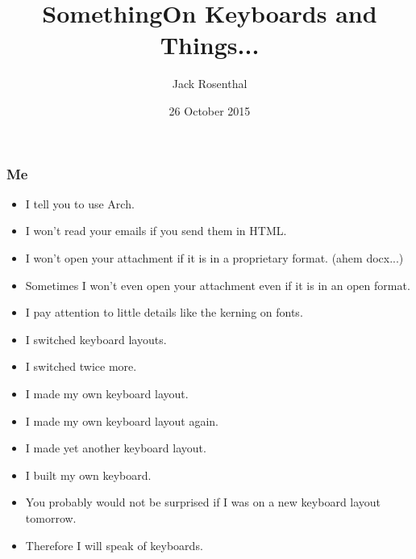 \documentclass{beamer}
\title{Something}
\author{Jack Rosenthal}
\date{26 October 2015}
\begin{document}
\begin{frame}
    \maketitle
\end{frame}

\begin{frame}
    \frametitle{Me}
    \pause
    \begin{itemize}
    \item I tell you to use Arch.\pause
    \item I won't read your emails if you send them in HTML.\pause
    \item I won't open your attachment if it is in a proprietary format. (ahem
        docx...)\pause
    \item Sometimes I won't even open your attachment even if it is in an open
        format.\pause
    \item I pay attention to little details like the kerning on fonts.\pause
    \item I switched keyboard layouts.\pause
    \item I switched twice more.\pause
    \item I made my own keyboard layout.\pause
    \item I made my own keyboard layout again.\pause
    \item I made yet another keyboard layout.\pause
    \item I built my own keyboard.\pause
    \item You probably would not be surprised if I was on a new keyboard layout
        tomorrow.\pause
    \item Therefore I will speak of keyboards.
    \end{itemize}
\end{frame}

\title{On Keyboards and Things...}

\begin{frame}
    \maketitle
\end{frame}
\end{document}
